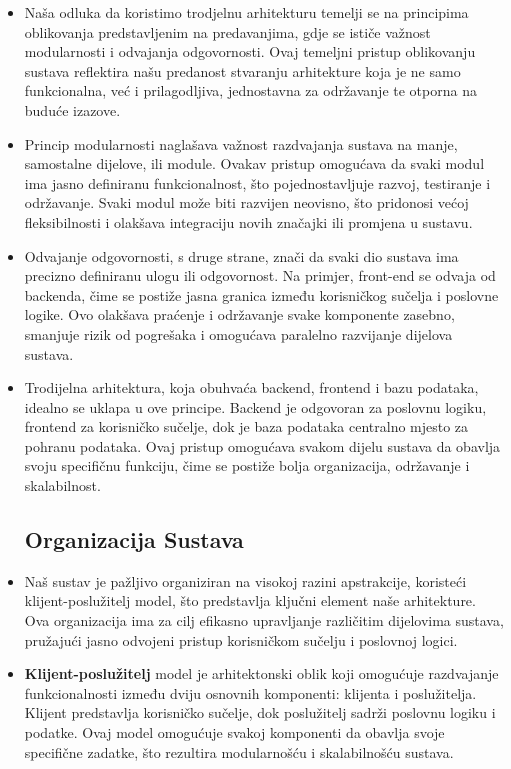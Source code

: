 \begin{itemize}
    \item Naša odluka da koristimo trodjelnu arhitekturu temelji se na principima oblikovanja predstavljenim na predavanjima, gdje se ističe važnost modularnosti i odvajanja odgovornosti. Ovaj temeljni pristup oblikovanju sustava reflektira našu predanost stvaranju arhitekture koja je ne samo funkcionalna, već i prilagodljiva, jednostavna za održavanje te otporna na buduće izazove. 

    \item Princip modularnosti naglašava važnost razdvajanja sustava na manje, samostalne dijelove, ili module. Ovakav pristup omogućava da svaki modul ima jasno definiranu funkcionalnost, što pojednostavljuje razvoj, testiranje i održavanje. Svaki modul može biti razvijen neovisno, što pridonosi većoj fleksibilnosti i olakšava integraciju novih značajki ili promjena u sustavu. 

    \item Odvajanje odgovornosti, s druge strane, znači da svaki dio sustava ima precizno definiranu ulogu ili odgovornost. Na primjer, front-end se odvaja od backenda, čime se postiže jasna granica između korisničkog sučelja i poslovne logike. Ovo olakšava praćenje i održavanje svake komponente zasebno, smanjuje rizik od pogrešaka i omogućava paralelno razvijanje dijelova sustava. 

\item Trodijelna arhitektura, koja obuhvaća backend, frontend i bazu podataka, idealno se uklapa u ove principe. Backend je odgovoran za poslovnu logiku, frontend za korisničko sučelje, dok je baza podataka centralno mjesto za pohranu podataka. Ovaj pristup omogućava svakom dijelu sustava da obavlja svoju specifičnu funkciju, čime se postiže bolja organizacija, održavanje i skalabilnost. 

\subsection*{Organizacija Sustava}
\item Naš sustav je pažljivo organiziran na visokoj razini apstrakcije, koristeći klijent-poslužitelj model, što predstavlja ključni element naše arhitekture. Ova organizacija ima za cilj efikasno upravljanje različitim dijelovima sustava, pružajući jasno odvojeni pristup korisničkom sučelju i poslovnoj logici. 

\item \textbf{Klijent-poslužitelj} model je arhitektonski oblik koji omogućuje razdvajanje funkcionalnosti između dviju osnovnih komponenti: klijenta i poslužitelja. Klijent predstavlja korisničko sučelje, dok poslužitelj sadrži poslovnu logiku i podatke. Ovaj model omogućuje svakoj komponenti da obavlja svoje specifične zadatke, što rezultira modularnošću i skalabilnošću sustava. 


\end{itemize}
